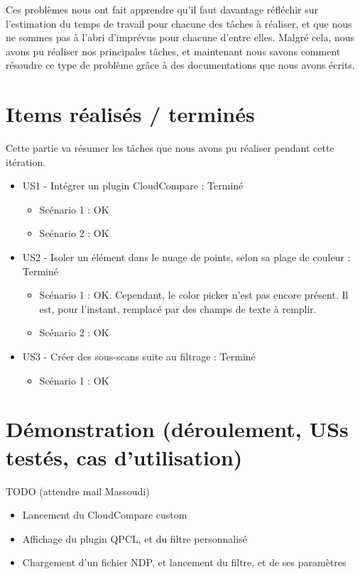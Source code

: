 \documentclass[12pt,titlepage,french]{article}
\begin{document}
Ces problèmes nous ont fait apprendre qu'il faut davantage réfléchir sur l'estimation du temps de travail pour chacune des tâches à réaliser, et que nous ne sommes pas à l'abri d'imprévus pour chacune d'entre elles. Malgré cela, nous avons pu réaliser nos principales tâches, et maintenant nous savons comment résoudre ce type de problème grâce à des documentations que nous avons écrits.

\section{Items réalisés / terminés}

Cette partie va résumer les tâches que nous avons pu réaliser pendant cette itération.

\begin{itemize}
  \item US1 - Intégrer un plugin CloudCompare : Terminé
  \begin{itemize}
    \item Scénario 1 : OK
    \item Scénario 2 : OK
  \end{itemize}
  \item US2 - Isoler un élément dans le nuage de points, selon sa plage de couleur : Terminé
  \begin{itemize}
    \item Scénario 1 : OK. Cependant, le color picker n'est pas encore présent. Il est, pour l'instant, remplacé par des champs de texte à remplir.
    \item Scénario 2 : OK
  \end{itemize}
  \item US3 - Créer des sous-scans suite au filtrage : Terminé
  \begin{itemize}
    \item Scénario 1 : OK
  \end{itemize}
\end{itemize}

\section{Démonstration (déroulement, USs testés, cas d'utilisation)}
TODO (attendre mail Massoudi)
\begin{itemize}
  \item Lancement du CloudCompare custom
  \item Affichage du plugin QPCL, et du filtre personnalisé
  \item Chargement d'un fichier NDP, et lancement du filtre, et de ses paramètres
\end{itemize}
\end{document}
